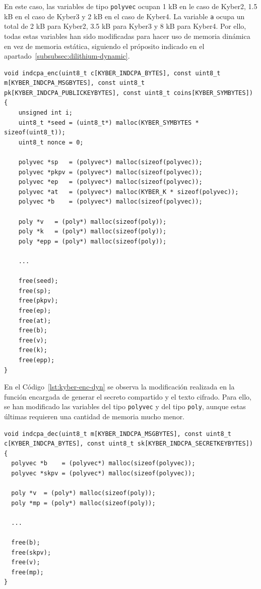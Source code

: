 En este caso, las variables de tipo \texttt{polyvec} ocupan 1 kB en le caso de Kyber2, 1.5 kB en el caso de Kyber3 y 2 kB en el caso de Kyber4.
La variable \texttt{a} ocupa un total de 2 kB para Kyber2, 3.5 kB para Kyber3 y 8 kB para Kyber4.
Por ello, todas estas variables han sido modificadas para hacer uso de memoria dinámica en vez de memoria estática, siguiendo el próposito indicado en el apartado~\ref{subsubsec:dilithium-dynamic}.

\begin{lstlisting}[label={lst:kyber-enc-dyn},style=Cnice,firstnumber=1,caption={Modificación de la función \texttt{indcpa\_enc} en el archivo \texttt{Kyber/main/src/indcpa.c}.}]
void indcpa_enc(uint8_t c[KYBER_INDCPA_BYTES], const uint8_t m[KYBER_INDCPA_MSGBYTES], const uint8_t pk[KYBER_INDCPA_PUBLICKEYBYTES], const uint8_t coins[KYBER_SYMBYTES])
{
    unsigned int i;
    uint8_t *seed = (uint8_t*) malloc(KYBER_SYMBYTES * sizeof(uint8_t));
    uint8_t nonce = 0;

    polyvec *sp   = (polyvec*) malloc(sizeof(polyvec));
    polyvec *pkpv = (polyvec*) malloc(sizeof(polyvec));
    polyvec *ep   = (polyvec*) malloc(sizeof(polyvec));
    polyvec *at   = (polyvec*) malloc(KYBER_K * sizeof(polyvec));
    polyvec *b    = (polyvec*) malloc(sizeof(polyvec));

    poly *v   = (poly*) malloc(sizeof(poly));
    poly *k   = (poly*) malloc(sizeof(poly));
    poly *epp = (poly*) malloc(sizeof(poly));

    ...

    free(seed);
    free(sp);
    free(pkpv);
    free(ep);
    free(at);
    free(b);
    free(v);
    free(k);
    free(epp);
}
\end{lstlisting}

En el Código~\ref{lst:kyber-enc-dyn} se observa la modificación realizada en la función encargada de generar el secreto compartido y el texto cifrado.
Para ello, se han modificado las variables del tipo \texttt{polyvec} y del tipo \texttt{poly}, aunque estas últimas requieren una cantidad de memoria mucho menor.

\begin{lstlisting}[label={lst:kyber-dec-dyn},style=Cnice,firstnumber=1,caption={Modificación de la función \texttt{indcpa\_dec} en el archivo \texttt{Kyber/main/src/indcpa.c}.}]
void indcpa_dec(uint8_t m[KYBER_INDCPA_MSGBYTES], const uint8_t c[KYBER_INDCPA_BYTES], const uint8_t sk[KYBER_INDCPA_SECRETKEYBYTES])
{
  polyvec *b    = (polyvec*) malloc(sizeof(polyvec));
  polyvec *skpv = (polyvec*) malloc(sizeof(polyvec));

  poly *v  = (poly*) malloc(sizeof(poly));
  poly *mp = (poly*) malloc(sizeof(poly));

  ...

  free(b);
  free(skpv);
  free(v);
  free(mp);
}
\end{lstlisting}

